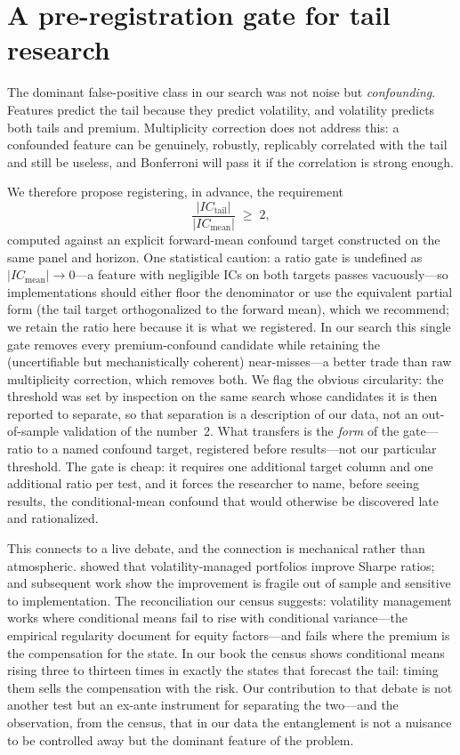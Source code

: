 \documentclass[11pt]{article}
\begin{document}
\section{A pre-registration gate for tail research}\label{sec:gate}
The dominant false-positive class in our search was not noise but \emph{confounding}. Features
predict the tail because they predict volatility, and volatility predicts both tails and
premium. Multiplicity correction does not address this: a confounded feature can be genuinely,
robustly, replicably correlated with the tail and still be useless, and Bonferroni will pass it
if the correlation is strong enough.

We therefore propose registering, in advance, the requirement
\[ \frac{|IC_{\mathrm{tail}}|}{|IC_{\mathrm{mean}}|} \;\ge\; 2, \]
computed against an explicit forward-mean confound target constructed on the same panel and
horizon. One statistical caution: a ratio gate is undefined as $|IC_{\mathrm{mean}}| \to 0$---a
feature with negligible ICs on both targets passes vacuously---so implementations should either
floor the denominator or use the equivalent partial form (the tail target orthogonalized to the
forward mean), which we recommend; we retain the ratio here because it is what we registered.
In our search this single gate removes every premium-confound candidate while
retaining the (uncertifiable but mechanistically coherent) near-misses---a better trade than
raw multiplicity correction, which removes both. We flag the obvious circularity: the threshold
was set by inspection on the same search whose candidates it is then reported to separate, so
that separation is a description of our data, not an out-of-sample validation of the number~2.
What transfers is the \emph{form} of the gate---ratio to a named confound target, registered
before results---not our particular threshold. The gate is cheap: it requires one additional
target column and one additional ratio per test, and it forces the researcher to name, before
seeing results, the conditional-mean confound that would otherwise be discovered late and
rationalized.

This connects to a live debate, and the connection is mechanical rather than atmospheric.
\citet{mm} showed that volatility-managed portfolios improve Sharpe ratios; \citet{ced} and
subsequent work show the improvement is fragile out of sample and sensitive to implementation.
The reconciliation our census suggests: volatility management works where conditional means
fail to rise with conditional variance---the empirical regularity \citet{mm} document for
equity factors---and fails where the premium is the compensation for the state. In our book
the census shows conditional means rising three to thirteen times in exactly the states that
forecast the tail: timing them sells the compensation with the risk. Our contribution to that
debate is not another test but an ex-ante
instrument for separating the two---and the observation, from the census, that in our data the
entanglement is not a nuisance to be controlled away but the dominant feature of the problem.
\end{document}
